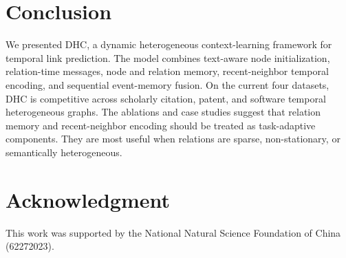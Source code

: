 \documentclass[runningheads]{llncs}
\begin{document}












\section{Conclusion}
We presented DHC, a dynamic heterogeneous context-learning framework for temporal link prediction. 
The model combines text-aware node initialization, relation-time messages, node and relation memory, recent-neighbor temporal encoding, and sequential event-memory fusion. 
On the current four datasets, DHC is competitive across scholarly citation, patent, and software temporal heterogeneous graphs. The ablations and case studies suggest that relation memory and recent-neighbor encoding should be treated as task-adaptive components. 
They are most useful when relations are sparse, non-stationary, or semantically heterogeneous.

\section*{Acknowledgment}
This work was supported by the National Natural Science Foundation of China (62272023).
\begingroup
\footnotesize


\endgroup
\end{document}
